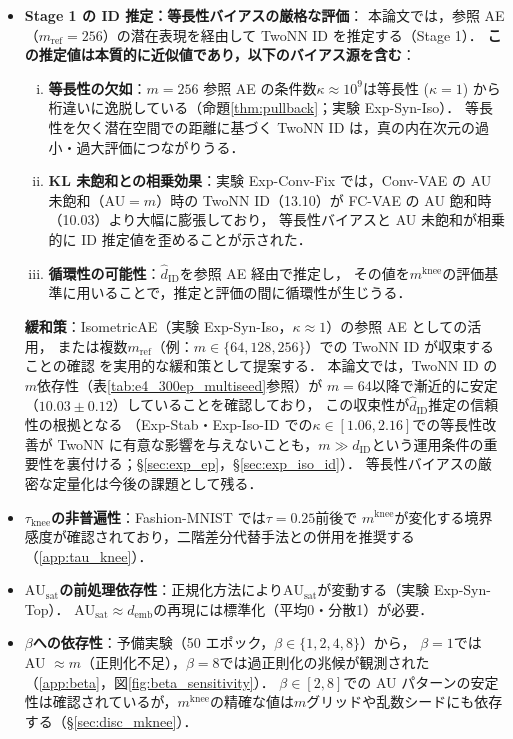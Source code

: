 \documentclass[11pt,a4paper]{jsarticle}
\newcommand{\kap}{\kappa}
\newcommand{\AUsat}{\mathrm{AU}_{\mathrm{sat}}}
\newcommand{\mknee}{m^{\mathrm{knee}}}
\newcommand{\demb}{d_{\mathrm{emb}}}
\begin{document}
\begin{itemize}
  \item \textbf{Stage 1 の ID 推定：等長性バイアスの厳格な評価}：
        本論文では，参照 AE（$m_\mathrm{ref}=256$）の潜在表現を経由して TwoNN ID を推定する（Stage 1）．
        \textbf{この推定値は本質的に近似値であり，以下のバイアス源を含む}：
        \begin{enumerate}[(i)]
          \item \textbf{等長性の欠如}：$m=256$ 参照 AE の条件数$\kap \approx 10^9$は等長性
                ($\kap=1$) から桁違いに逸脱している（命題\ref{thm:pullback}；実験 Exp-Syn-Iso）．
                等長性を欠く潜在空間での距離に基づく TwoNN ID は，真の内在次元の過小・過大評価につながりうる．
          \item \textbf{KL 未飽和との相乗効果}：実験 Exp-Conv-Fix では，Conv-VAE の AU 未飽和（AU$=m$）時の
                TwoNN ID（13.10）が FC-VAE の AU 飽和時（10.03）より大幅に膨張しており，
                等長性バイアスと AU 未飽和が相乗的に ID 推定値を歪めることが示された．
          \item \textbf{循環性の可能性}：$\hat{d}_\mathrm{ID}$を参照 AE 経由で推定し，
                その値を$\mknee$の評価基準に用いることで，推定と評価の間に循環性が生じうる．
        \end{enumerate}
        \textbf{緩和策}：IsometricAE（実験 Exp-Syn-Iso，$\kap \approx 1$）の参照 AE としての活用，
        または複数$m_\mathrm{ref}$（例：$m \in \{64, 128, 256\}$）での TwoNN ID が収束することの確認
        を実用的な緩和策として提案する．
        本論文では，TwoNN ID の$m$依存性（表\ref{tab:e4_300ep_multiseed}参照）が
        $m=64$以降で漸近的に安定（$10.03 \pm 0.12$）していることを確認しており，
        この収束性が$\hat{d}_\mathrm{ID}$推定の信頼性の根拠となる
        （Exp-Stab・Exp-Iso-ID での$\kap \in [1.06, 2.16]$での等長性改善が TwoNN に有意な影響を与えないことも，$m \gg d_\mathrm{ID}$という運用条件の重要性を裏付ける；§\ref{sec:exp_ep}，§\ref{sec:exp_iso_id}）．
        等長性バイアスの厳密な定量化は今後の課題として残る．
  \item \textbf{$\tau_{\mathrm{knee}}$の非普遍性}：Fashion-MNIST では$\tau = 0.25$前後で
        $\mknee$が変化する境界感度が確認されており，二階差分代替手法との併用を推奨する
        （\ref{app:tau_knee}）．
  \item \textbf{$\AUsat$の前処理依存性}：正規化方法により$\AUsat$が変動する（実験 Exp-Syn-Top）．
        $\AUsat \approx \demb$の再現には標準化（平均0・分散1）が必要．
  \item \textbf{$\beta$への依存性}：予備実験（50 エポック，$\beta \in \{1,2,4,8\}$）から，
        $\beta = 1$では AU $\approx m$（正則化不足），$\beta = 8$では過正則化の兆候が観測された
        （\ref{app:beta}，図\ref{fig:beta_sensitivity}）．
        $\beta \in [2, 8]$での AU パターンの安定性は確認されているが，$\mknee$の精確な値は$m$グリッドや乱数シードにも依存する（§\ref{sec:disc_mknee}）．
\end{itemize}
\end{document}
